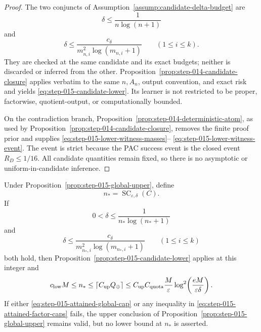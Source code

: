 \begin{proof}
The two conjuncts of
Assumption~\ref{assump:candidate-delta-budget} are
\begin{equation}\label{eq:step-015-global-delta-cap}
\delta\le\frac1{n\log(n+1)}
\end{equation}
and
\begin{equation}\label{eq:step-015-factor-delta-caps}
\delta\le
\frac{c_\delta}{m_{n,i}^2\log(m_{n,i}+1)}
\qquad(1\le i\le k).
\end{equation}
They are checked at the same candidate and its exact budgets; neither
is discarded or inferred from the other.
Proposition~\ref{prop:step-014-candidate-closure} applies verbatim to
the same \(n,A_n\), output convention, and exact risk and yields
\eqref{eq:step-015-candidate-lower}.  Its learner is not restricted to
be proper, factorwise, quotient-output, or computationally bounded.

On the contradiction branch,
Proposition~\ref{prop:step-014-deterministic-atom}, as used by
Proposition~\ref{prop:step-014-candidate-closure}, removes the finite
proof prior and supplies
\eqref{eq:step-015-lower-witness-masses}--%
\eqref{eq:step-015-lower-witness-event}.  The event is strict because
the PAC success event is the closed event \(R_D\le1/16\).
All candidate quantities remain fixed, so there is no asymptotic or
uniform-in-candidate inference.
\end{proof}

\begin{proposition}
\label{prop:step-015-conditional-sandwich}
Under Proposition~\ref{prop:step-015-global-upper}, define
\begin{equation}\label{eq:step-015-attained-sample-complexity}
n_*=\operatorname{SC}_{\varepsilon,\delta}(C).
\end{equation}
If
\begin{equation}\label{eq:step-015-attained-global-cap}
0<\delta\le\frac1{n_*\log(n_*+1)}
\end{equation}
and
\begin{equation}\label{eq:step-015-attained-factor-caps}
\delta\le
\frac{c_\delta}
{m_{n_*,i}^2\log(m_{n_*,i}+1)}
\qquad(1\le i\le k)
\end{equation}
both hold, then
Proposition~\ref{prop:step-015-candidate-lower} applies at this integer
and
\begin{equation}\label{eq:step-015-conditional-sandwich}
c_{\rm low}M
\le n_*
\le\left\lceil C_{\rm up}Q_\oplus\right\rceil
\le C_{\rm up}C_{\rm quota}
\frac{M}{\varepsilon}
\log^2\!\left(\frac{eM}{\varepsilon\delta}\right).
\end{equation}
If either \eqref{eq:step-015-attained-global-cap} or any inequality in
\eqref{eq:step-015-attained-factor-caps} fails, the upper conclusion of
Proposition~\ref{prop:step-015-global-upper} remains valid, but no lower
bound at \(n_*\) is asserted.
\end{proposition}

